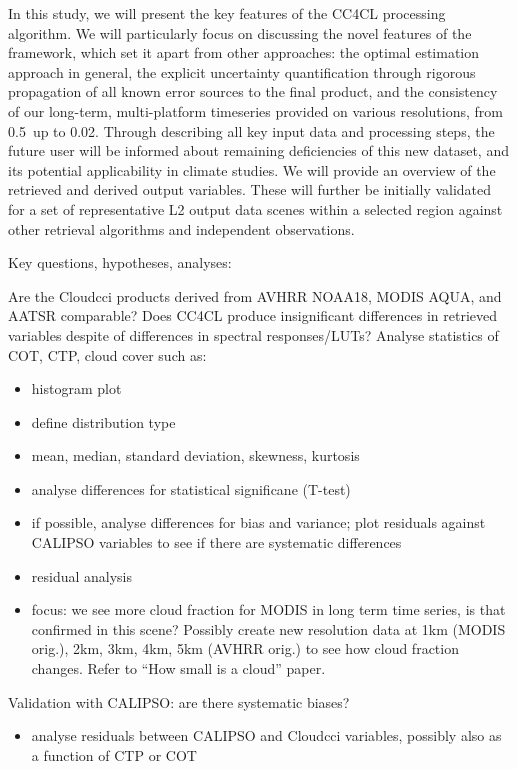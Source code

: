 In this study, we will present the key features of the CC4CL processing algorithm. We will particularly focus on discussing the novel features of the framework, which set it apart from other approaches: the optimal estimation approach in general, the explicit uncertainty quantification through rigorous propagation of all known error sources to the final product, and the consistency of our long-term, multi-platform timeseries provided on various resolutions, from 0.5\textdegree\ up to 0.02\textdegree. Through describing all key input data and processing steps, the future user will be informed about remaining deficiencies of this new dataset, and its potential applicability in climate studies. We will provide an overview of the retrieved and derived output variables. These will further be initially validated for a set of representative L2 output data scenes within a selected region against other retrieval algorithms and independent observations. 

Key questions, hypotheses, analyses:

Are the Cloud\textunderscore cci products derived from AVHRR NOAA18, MODIS AQUA, and AATSR comparable? Does CC4CL produce insignificant differences in retrieved variables despite of differences in spectral responses/LUTs? Analyse statistics of COT, CTP, cloud cover such as:
\begin{itemize}
\item histogram plot
\item define distribution type
\item mean, median, standard deviation, skewness, kurtosis
\item analyse differences for statistical significane (T-test)
\item if possible, analyse differences for bias and variance; plot residuals against CALIPSO variables to see if there are systematic differences
\item residual analysis
\item focus: we see more cloud fraction for MODIS in long term time series, is that confirmed in this scene? Possibly create new resolution data at 1km (MODIS orig.), 2km, 3km, 4km, 5km (AVHRR orig.) to see how cloud fraction changes. Refer to ``How small is a cloud'' paper.
\end{itemize}

Validation with CALIPSO: are there systematic biases? 
\begin{itemize}
\item analyse residuals between CALIPSO and Cloud\textunderscore cci variables, possibly also as a function of CTP or COT
\end{itemize}


